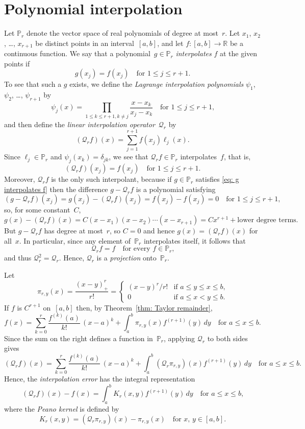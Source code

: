 \section{Polynomial interpolation}

Let $\mathbb{P}_r$ denote the vector space of real polynomials of degree at 
most~$r$.  Let $x_1$, $x_2$, \dots, $x_{r+1}$ be distinct points in an 
interval~$[a,b]$, and let $f:[a,b]\to\mathbb{R}$ be a continuous function.  We 
say that a polynomial~$g\in\mathbb{P}_r$ \emph{interpolates} $f$ at the given 
points if
\begin{equation}\label{eq: g interpolates f}
g(x_j)=f(x_j)\quad\text{for $1\le j\le r+1$.}
\end{equation}
To see that such a $g$ exists, we define the \emph{Lagrange 
interpolation polynomials} $\psi_1$, $\psi_2$, \dots, $\psi_{r+1}$ by
\[
\psi_j(x)=\prod_{1\le k\le r+1, k\ne j}
	\frac{x-x_k}{x_j-x_k}\quad\text{for $1\le j\le r+1$,}
\]
and then define the \emph{linear interpolation operator}~$\mathcal{Q}_r$ by
\[
(\mathcal{Q}_rf)(x)=\sum_{j=1}^{r+1}f(x_j)\ell_j(x).
\]
Since $\ell_j\in\mathbb{P}_r$ and $\psi_j(x_k)=\delta_{jk}$, we see that
$\mathcal{Q}_rf\in\mathbb{P}_r$ interpolates~$f$, that is,
\[
(\mathcal{Q}_rf)(x_j)=f(x_j)\quad\text{for $1\le j\le r+1$.}
\]
Moreover, $\mathcal{Q}_rf$ is the only such interpolant, because if 
$g\in\mathbb{P}_r$ satisfies \eqref{eq: g interpolates f} then the difference
$g-\mathcal{Q}_rf$ is a polynomial satisfying
\[
(g-\mathcal{Q}_rf)(x_j)=g(x_j)-(\mathcal{Q}_rf)(x_j)=f(x_j)-f(x_j)=0
	\quad\text{for $1\le j\le r+1$,}
\]
so, for some constant~$C$,
\[
g(x)-(\mathcal{Q}_rf)(x)=C(x-x_1)(x-x_2)\cdots(x-x_{r+1}) 
	=Cx^{r+1}+\text{lower degree terms}.
\]
But $g-\mathcal{Q}_rf$ has degree at most~$r$, so $C=0$ and hence
$g(x)=(\mathcal{Q}_rf)(x)$ for all~$x$. In particular, since any element 
of~$\mathbb{P}_r$ interpolates itself, it follows that
\[
\mathcal{Q}_rf=f\quad\text{for every $f\in\mathbb{P}_r$,}
\]
and thus $\mathcal{Q}_r^2=\mathcal{Q}_r$.  Hence, $\mathcal{Q}_r$ is a 
\emph{projection} onto~$\mathbb{P}_r$.

Let 
\[
\pi_{r,y}(x)=\frac{(x-y)_+^r}{r!}=\begin{cases}
	(x-y)^r/r!&\text{if $a\le y\le x\le b$,}\\
	0&\text{if $a\le x<y\le b$.}
\end{cases}
\]
If $f$ is $C^{r+1}$ on~$[a,b]$ then, by Theorem~\ref{thm: Taylor remainder}, 
\[
f(x)=\sum_{k=0}^r\frac{f^{(k)}(a)}{k!}\,(x-a)^k
	+\int_a^b\pi_{r,y}(x)f^{(r+1)}(y)\,dy\quad\text{for $a\le x\le b$.}
\]
Since the sum on the right defines a function in~$\mathbb{P}_r$,
applying $\mathcal{Q}_r$ to both sides gives
\[
(\mathcal{Q}_rf)(x)=\sum_{k=0}^r\frac{f^{(k)}(a)}{k!}\,(x-a)^k
	+\int_a^b(\mathcal{Q}_r\pi_{r,y})(x)f^{(r+1)}(y)\,dy
\quad\text{for $a\le x\le b$.}
\]
Hence, the \emph{interpolation error} has the integral representation
\[
(\mathcal{Q}_rf)(x)-f(x)=\int_a^b K_r(x,y)f^{(r+1)}(y)\,dy
\quad\text{for $a\le x\le b$,}
\]
where the \emph{Peano kernel} is defined by
\[
K_r(x,y)=(\mathcal{Q}_r\pi_{r,y})(x)-\pi_{r,y}(x)
	\quad\text{for $x$, $y\in[a,b]$.}
\]

